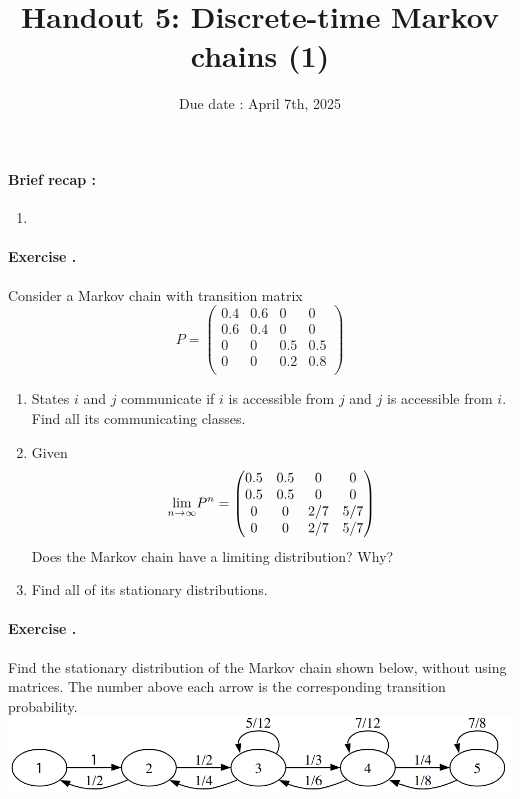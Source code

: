 \documentclass[12pt,a4paper]{article}
\title{ \bfseries \Huge {Handout 5: Discrete-time Markov chains (1)}}
\date{Due date : April 7th, 2025}
\newcounter{num}  %
\begin{document}
	\maketitle
	
	\paragraph{Brief recap :}
\begin{enumerate}
	\item 
\end{enumerate}



\paragraph{Exercise \thenum.}%
Consider a Markov chain with transition matrix
$$P = \left(
\begin{matrix}
	0.4 &0.6& 0& 0\\
	0.6& 0.4& 0 &0\\
	0& 0 &0.5 &0.5\\
	0 &0 &0.2 &0.8\\
\end{matrix}
\right)
$$
\begin{enumerate}
	\item States $i$ and $j$ communicate if $i$ is accessible from $j$ and $j$ is accessible from $i$. 
	Find all its communicating classes.
	\item Given
	$$
	\underset{n\rightarrow \infty}{\rm lim} P^n = 
	\left(
	\begin{matrix}
		0.5 &0.5& 0& 0\\
		0.5& 0.5& 0 &0\\
		0& 0 &2/7 &5/7\\
		0 &0 &2/7 &5/7\\
	\end{matrix}
	\right)
	$$
	Does the Markov chain have a limiting distribution? Why?
	\item Find all of its stationary distributions.
\end{enumerate} 

\paragraph{Exercise \thenum.} %
Find the stationary distribution of the Markov chain shown below, without using matrices. 
The number above each arrow is the corresponding transition probability.
\includegraphics[width = .6\textwidth]{images/markov_rev.png}
\end{document}
